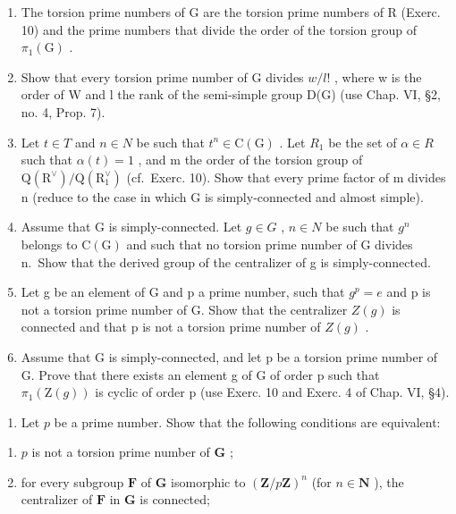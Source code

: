 \begin{enumerate}
\begin{enumerate}
\def\labelenumi{\alph{enumi})}
\item
  The torsion prime numbers of G are the torsion prime numbers of R (Exerc. 10) and the prime numbers that divide the order of the torsion group of \(\pi_1(\mathrm{G})\) .
\item
  Show that every torsion prime number of G divides \(w/l!\) , where w is the order of W and l the rank of the semi-simple group D(G) (use Chap. VI, §2, no. 4, Prop. 7).
\item
  Let \(t \in T\) and \(n \in N\) be such that \(t^{n} \in \mathrm{C}(\mathrm{G})\) . Let \(R_{1}\) be the set of \(\alpha \in R\) such that \(\alpha(t) = 1\) , and m the order of the torsion group of \(\mathrm{Q}(\mathrm{R}^{\vee}) / \mathrm{Q}(\mathrm{R}_{1}^{\vee})\) (cf.~Exerc. 10). Show that every prime factor of m divides n (reduce to the case in which G is simply-connected and almost simple).
\item
  Assume that G is simply-connected. Let \(g \in G\) , \(n \in N\) be such that \(g^{n}\) belongs to \(\mathrm{C}(\mathrm{G})\) and such that no torsion prime number of G divides n.~Show that the derived group of the centralizer of g is simply-connected.
\item
  Let g be an element of G and p a prime number, such that \(g^{p} = e\) and p is not a torsion prime number of G. Show that the centralizer \(Z(g)\) is connected and that p is not a torsion prime number of \(Z(g)\) .
\item
  Assume that G is simply-connected, and let p be a torsion prime number of G. Prove that there exists an element g of G of order p such that \(\pi_{1}(\mathrm{Z}(g))\) is cyclic of order p (use Exerc. 10 and Exerc. 4 of Chap. VI, §4).
\end{enumerate}

\begin{enumerate}
\def\labelenumi{\arabic{enumi})}
\setcounter{enumi}{11}
\tightlist
\item
  Let \(p\) be a prime number. Show that the following conditions are equivalent:
\end{enumerate}

\begin{enumerate}
\def\labelenumi{(\roman{enumi})}
\item
  \(p\) is not a torsion prime number of \(\mathbf{G}\) ;
\item
  for every subgroup \(\mathbf{F}\) of \(\mathbf{G}\) isomorphic to \((\mathbf{Z} / p\mathbf{Z})^n\) (for \(n\in \mathbf{N}\) ), the centralizer of \(\mathbf{F}\) in \(\mathbf{G}\) is connected;
\end{enumerate}


\end{enumerate}
